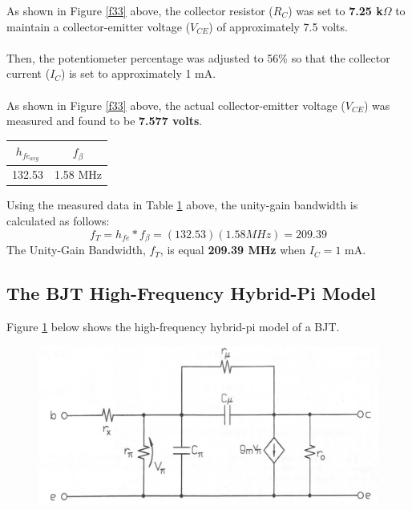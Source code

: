 \documentclass{article}
\begin{document}
	\noindent As shown in Figure \ref{f33} above, the collector resistor ($R_C$) was set to \textbf{7.25 k$\Omega$} to maintain a collector-emitter voltage ($V_{CE}$) of approximately 7.5 volts.\\\\
	Then, the potentiometer percentage was adjusted to 56\% so that the collector current ($I_C$) is set to approximately 1 mA.\\\\
	As shown in Figure \ref{f33} above, the actual collector-emitter voltage ($V_{CE}$) was measured and found to be \textbf{7.577 volts}.
	
	\begin{table}[!ht]
		\centering
		\label{t14}
		\begin{tabular}{|c|c|}
			\hline
			$h_{fe_{avg}}$ & $f_{\beta}$\\
			\hline\hline
			132.53 & 1.58 MHz\\
			\hline
		\end{tabular}
	\end{table}	

	\noindent Using the measured data in Table \ref{t14} above, the unity-gain bandwidth is calculated as follows:
	$$f_T = h_{fe} * f_{\beta} = (132.53)(1.58 MHz) = 209.39$$
	The Unity-Gain Bandwidth, $f_T$, is equal \textbf{209.39 MHz} when $I_C = 1$ mA.

	\pagebreak
	
	\subsection{The BJT High-Frequency Hybrid-Pi Model}
	Figure \ref{f36} below shows the high-frequency hybrid-pi model of a BJT.
	\begin{figure}[!ht]
		\centering
		\includegraphics[width=0.75\linewidth]{hybridpi.png}
		\label{f36}
	\end{figure}
	
\end{document}
